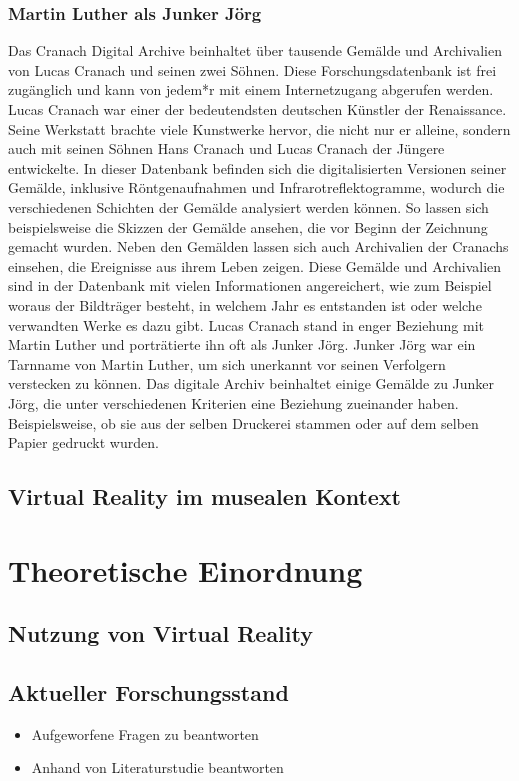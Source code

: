 \documentclass[a4paper,12pt,oneside]{article}
\begin{document}
        
    \subsubsection{Martin Luther als Junker Jörg}

    Das Cranach Digital Archive beinhaltet über tausende Gemälde und Archivalien von Lucas Cranach und seinen
    zwei Söhnen. Diese Forschungsdatenbank ist frei zugänglich und kann von jedem*r mit einem
    Internetzugang abgerufen werden.
    Lucas Cranach war einer der bedeutendsten deutschen Künstler der Renaissance. Seine Werkstatt
    brachte viele Kunstwerke hervor, die nicht nur er alleine, sondern auch mit seinen Söhnen 
    Hans Cranach und Lucas Cranach der Jüngere entwickelte. In dieser Datenbank befinden sich die digitalisierten
    Versionen seiner Gemälde, inklusive Röntgenaufnahmen und Infrarotreflektogramme, wodurch die
    verschiedenen Schichten der Gemälde analysiert werden können. So lassen sich beispielsweise die
    Skizzen der Gemälde ansehen, die vor Beginn der Zeichnung gemacht wurden. Neben den Gemälden
    lassen sich auch Archivalien der Cranachs einsehen, die Ereignisse aus ihrem Leben zeigen.
    Diese Gemälde und Archivalien sind in der Datenbank mit vielen Informationen angereichert, wie zum Beispiel
    woraus der Bildträger besteht, in welchem Jahr es entstanden ist oder welche verwandten Werke es dazu gibt.
    Lucas Cranach stand in enger Beziehung mit Martin Luther und porträtierte ihn oft als Junker Jörg. Junker Jörg
    war ein Tarnname von Martin Luther, um sich unerkannt vor seinen Verfolgern verstecken zu können. Das digitale
    Archiv beinhaltet einige Gemälde zu Junker Jörg, die unter verschiedenen Kriterien eine Beziehung zueinander haben.
    Beispielsweise, ob sie aus der selben Druckerei stammen oder auf dem selben Papier gedruckt wurden.
    \subsection{Virtual Reality im musealen Kontext}
  \section{Theoretische Einordnung}
    \subsection{Nutzung von Virtual Reality}
    \subsection{Aktueller Forschungsstand}
      \begin{itemize}
        \item Aufgeworfene Fragen zu beantworten
        \item Anhand von Literaturstudie beantworten
      \end{itemize}
\end{document}
